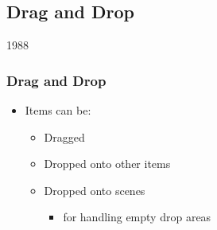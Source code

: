 %
%
%
%

\subsection{Drag and Drop}
\begin{slide}{1988}


\frametitle{Drag and Drop}
\begin{itemize}
\item Items can be:
    \begin{itemize}
    \item Dragged
    \item Dropped onto other items
    \item Dropped onto scenes
        \begin{itemize}
        \item for handling empty drop areas
        \end{itemize}
    \end{itemize}
\end{itemize}

\end{slide}

